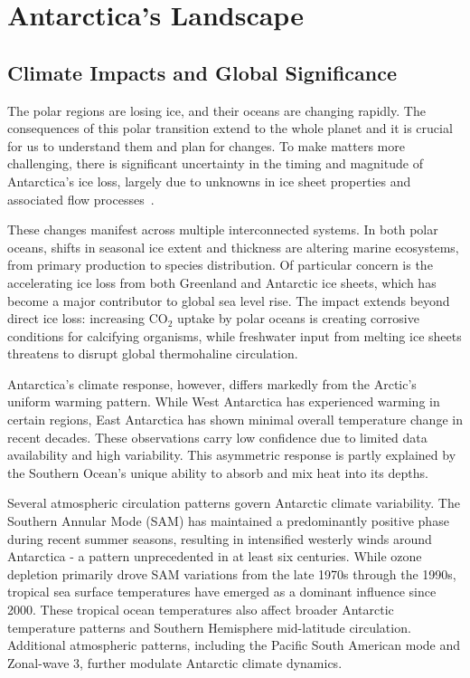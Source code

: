 \chapter*{Antarctica's Landscape}\label{why}
\section*{Climate Impacts and Global Significance}

The polar regions are losing ice, and their oceans are changing rapidly\cite{O_C_in_changingClimate}. The consequences of this polar transition extend to the whole planet and it is crucial for us to understand them and plan for changes. To make matters more challenging, there is significant uncertainty in the timing and magnitude of Antarctica's ice loss, largely due to unknowns in ice sheet properties and associated flow processes~\cite{IPCC}.

These changes manifest across multiple interconnected systems. In both polar oceans, shifts in seasonal ice extent and thickness are altering marine ecosystems, from primary production to species distribution\cite{O_C_in_changingClimate}. Of particular concern is the accelerating ice loss from both Greenland and Antarctic ice sheets, which has become a major contributor to global sea level rise\cite{O_C_in_changingClimate}. The impact extends beyond direct ice loss: increasing $\mathrm{CO_2}$ uptake by polar oceans is creating corrosive conditions for calcifying organisms\cite{O_C_in_changingClimate}, while freshwater input from melting ice sheets threatens to disrupt global thermohaline circulation\cite{Jacobs_2004}.

Antarctica's climate response, however, differs markedly from the Arctic's uniform warming pattern. While West Antarctica has experienced warming in certain regions, East Antarctica has shown minimal overall temperature change in recent decades. These observations carry low confidence due to limited data availability and high variability\cite{O_C_in_changingClimate}. This asymmetric response is partly explained by the Southern Ocean's unique ability to absorb and mix heat into its depths\cite{L_T_C_C}.
 

Several atmospheric circulation patterns govern Antarctic climate variability. The Southern Annular Mode (SAM) has maintained a predominantly positive phase during recent summer seasons, resulting in intensified westerly winds around Antarctica - a pattern unprecedented in at least six centuries. While ozone depletion primarily drove SAM variations from the late 1970s through the 1990s, tropical sea surface temperatures have emerged as a dominant influence since 2000\cite{O_C_in_changingClimate}. These tropical ocean temperatures also affect broader Antarctic temperature patterns and Southern Hemisphere mid-latitude circulation\cite{Jacobs_2004}. Additional atmospheric patterns, including the Pacific South American mode and Zonal-wave 3, further modulate Antarctic climate dynamics.

